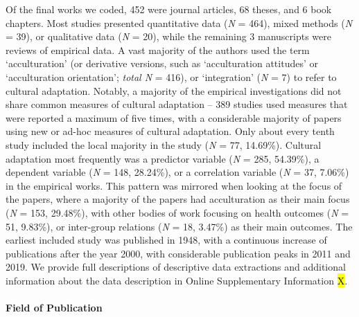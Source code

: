 

Of the final works we coded, 452 were journal articles, 68 theses, and 6
book chapters. Most studies presented quantitative data (\textit{N} =
464), mixed methods (\textit{N} = 39), or qualitative data (\textit{N} =
20), while the remaining 3 manuscripts were reviews of empirical data. A
vast majority of the authors used the term `acculturation' (or
derivative versions, such as `acculturation attitudes' or `acculturation
orientation'; \textit{total N} = 416), or `integration' (\textit{N} = 7)
to refer to cultural adaptation. Notably, a majority of the empirical
investigations did not share common measures of cultural adaptation --
389 studies used measures that were reported a maximum of five times,
with a considerable majority of papers using new or ad-hoc measures of
cultural adaptation. Only about every tenth study included the local
majority in the study (\textit{N} = 77, 14.69\%). Cultural adaptation
most frequently was a predictor variable (\textit{N} = 285, 54.39\%), a
dependent variable (\textit{N} = 148, 28.24\%), or a correlation
variable (\textit{N} = 37, 7.06\%) in the empirical works. This pattern
was mirrored when looking at the focus of the papers, where a majority
of the papers had acculturation as their main focus (\textit{N} = 153,
29.48\%), with other bodies of work focusing on health outcomes
(\textit{N} = 51, 9.83\%), or inter-group relations (\textit{N} = 18,
3.47\%) as their main outcomes. The earliest included study was
published in 1948, with a continuous increase of publications after the
year 2000, with considerable publication peaks in 2011 and 2019. We
provide full descriptions of descriptive data extractions and additional
information about the data description in Online Supplementary
Information \hl{X}.

\paragraph{Field of Publication}

